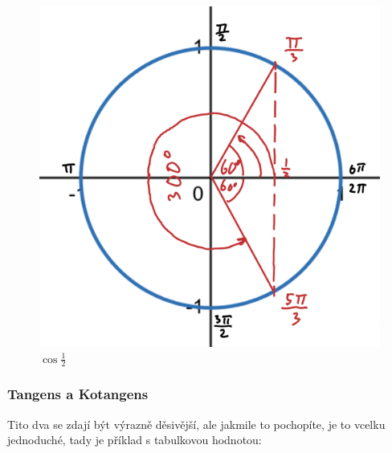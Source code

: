 \begin{figure}[H]
        \centering
        \includegraphics[width=0.4\linewidth]{img/7_JednotkovaKruznicekosinuspolovina.png}
        \caption{$\cos{\frac{1}{2}}$} 
        \label{fig:Kosinus jedné poloviny na jednotkové kružnici}
\end{figure}
\subsubsection{Tangens a Kotangens}
Tito dva se zdají být výrazně děsivější, ale jakmile to pochopíte, je to vcelku jednoduché, tady je příklad s tabulkovou hodnotou:
